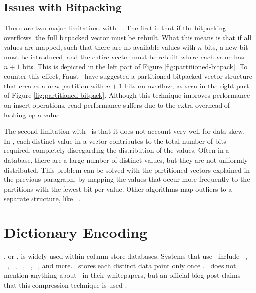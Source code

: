 \subsection{Issues with Bitpacking}
\label{sub:Issues with Bitpacking}
There are two major limitations with \bp~\cite{Faust2015-ke}. The first is that if the bitpacking overflows, the full bitpacked vector must be rebuilt. What this means is that if all values are mapped, such that there are no available values with $n$ bits, a new bit must be introduced, and the entire vector must be rebuilt where each value has $n + 1$ bits. This is depicted in the left part of Figure \ref{fig:partitioned-bitpack}. To counter this effect, Faust \ea~have suggested a partitioned bitpacked vector structure that creates a new partition with $n + 1$ bits on overflow, as seen in the right part of Figure \ref{fig:partitioned-bitpack}. Although this technique improves performance on insert operations, read performance suffers due to the extra overhead of looking up a value.

The second limitation with \bp~is that it does not account very well for data skew. In \bp, each distinct value in a vector contributes to the total number of bits required, completely disregarding the distribution of the values. Often in a database, there are a large number of distinct values, but they are not uniformly distributed. This problem can be solved with the partitioned vectors explained in the previous paragraph, by mapping the values that occur more frequently to the partitions with the fewest bit per value. Other algorithms map outliers to a separate structure, like \pfdelta~\cite{Bjorklund2011-wh}.


\section{Dictionary Encoding}
\label{sec:Dictionary Encoding}
\de, or , is widely used within column store databases. Systems that use \de~include \oracle~\cite{Lahiri2015-mz}, \ibm~\cite{Raman2013-em}, \saph~\cite{Farber2012-vh}, \sapnw~\cite{Lemke2010-is}, \blink~\cite{Johnson2008-cp}, \mssql~\cite{Larson2013-mc}, and more. \qlikview~stores each distinct data point only once \cite{Qlik2011-ef}. \tableau~does not mention anything about \de~in their whitepapers, but an official blog post claims that this compression technique is used \cite{noauthor_undated-us}.

